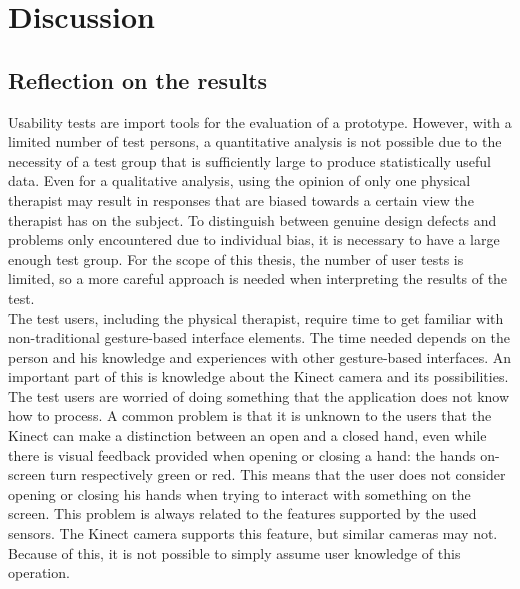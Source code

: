 \chapter{Discussion}


\section{Reflection on the results}

Usability tests are import tools for the evaluation of a prototype. However, with a limited number of test persons, a quantitative analysis is not possible due to the necessity of a test group that is sufficiently large to produce statistically useful data. Even for a qualitative analysis, using the opinion of only one physical therapist may result in responses that are biased towards a certain view the therapist has on the subject. To distinguish between genuine design defects and problems only encountered due to individual bias, it is necessary to have a large enough test group. For the scope of this thesis, the number of user tests is limited, so a more careful approach is needed when interpreting the results of the test.\\

The test users, including the physical therapist, require time to get familiar with non-traditional gesture-based interface elements. The time needed depends on the person and his knowledge and experiences with other gesture-based interfaces. An important part of this is knowledge about the Kinect camera and its possibilities. The test users are worried of doing something that the application does not know how to process. A common problem is that it is unknown to the users that the Kinect can make a distinction between an open and a closed hand, even while there is visual feedback provided when opening or closing a hand: the hands on-screen turn respectively green or red. This means that the user does not consider opening or closing his hands when trying to interact with something on the screen. This problem is always related to the features supported by the used sensors. The Kinect camera supports this feature, but similar cameras may not. Because of this, it is not possible to simply assume user knowledge of this operation.\\

